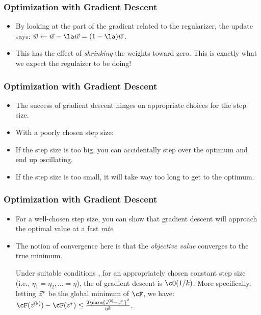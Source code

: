 \documentclass[trans,aspectratio=169]{beamer}
\begin{document}
\begin{frame}
  \frametitle{Optimization with Gradient Descent}
\begin{itemize}
\item
By looking at the part of the gradient related to the regularizer, the
update says: $\vw \leftarrow \vw - \la \vw = (1-\la) \vw$.  
\item This has
the effect of \emph{shrinking} the weights toward zero.  This is
exactly what we expect the regulaizer to be doing!
\end{itemize}
\end{frame}

\begin{frame}
  \frametitle{Optimization with Gradient Descent}
\begin{itemize}
\item
The success of gradient descent hinges on appropriate choices for the
step size.
\item With a poorly chosen step size:
\item If the step size is
too big, you can accidentally step over the optimum and end up
oscillating.
\item   If the step size is too small, it will take way too long
to get to the optimum.  
\end{itemize}
\end{frame}

\begin{frame}
  \frametitle{Optimization with Gradient Descent}
\begin{itemize}
\item For a well-chosen step size, you can show that
gradient descent will approach the optimal value at a fast
\emph{rate}.
\item   The notion of convergence here is that the
\emph{objective value} converges to the true minimum.
\begin{theorem} \label{thm:loss:gd}
  Under suitable conditions%
    , for an appropriately chosen
  constant step size (i.e., $\eta_1 = \eta_2, \dots = \eta$), the
   of gradient descent is $\cO(1/k)$.  More
  specifically, letting ${\vec z}^*$ be the global minimum of $\cF$, we
  have: $\cF(\vz\kth) - \cF(\vz^*) \leq \frac {2
    \norm{\vz\zth-\vz^*}^2} {\eta k}$.
\end{theorem}
\end{itemize}
\end{frame}
\end{document}
